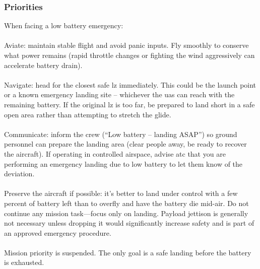             \subsubsection{Priorities} When facing a low battery emergency:
            
                \paragraph{}Aviate: maintain stable flight and avoid panic inputs. Fly smoothly to conserve what power remains (rapid throttle changes or fighting the wind aggressively can accelerate battery drain).
                
                \paragraph{}Navigate: head for the closest safe \ac{lz} immediately. This could be the launch point or a known emergency landing site – whichever the \ac{uas} can reach with the remaining battery. If the original \ac{lz} is too far, be prepared to land short in a safe open area rather than attempting to stretch the glide.
                
                \paragraph{}Communicate: inform the crew (“Low battery – landing ASAP”) so ground personnel can prepare the landing area (clear people away, be ready to recover the aircraft). If operating in controlled airspace, advise \ac{atc} that you are performing an emergency landing due to low battery to let them know of the deviation.
                
                \paragraph{}Preserve the aircraft if possible: it’s better to land under control with a few percent of battery left than to overfly and have the battery die mid-air. Do not continue any mission task—focus only on landing. Payload jettison is generally not necessary unless dropping it would significantly increase safety and is part of an approved emergency procedure.
                
                \paragraph{}Mission priority is suspended. The only goal is a safe landing before the battery is exhausted.
 
